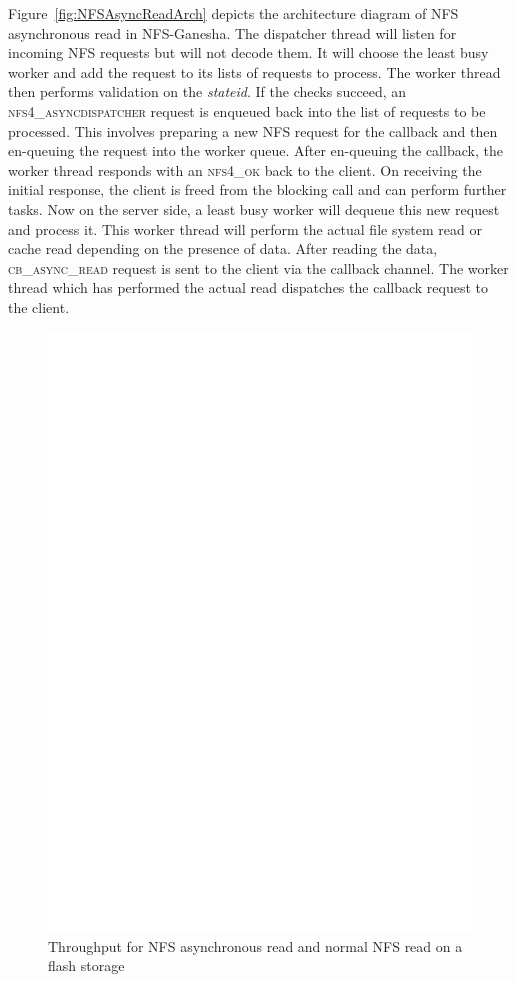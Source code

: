  Figure~\ref{fig:NFSAsyncReadArch} depicts the architecture diagram of NFS asynchronous read in NFS-Ganesha. The dispatcher thread will listen for incoming NFS requests but will not decode them. It will choose the least busy worker and add the request to its lists of requests to process. The worker thread then performs validation on the \textit{stateid}. If  the checks succeed, an \textsc{nfs4\_asyncdispatcher} request is enqueued back into the list of requests to be processed.  This involves preparing a new NFS request for the callback and then en-queuing the request into the worker queue. After en-queuing the callback, the worker thread responds with an \textsc{nfs4\_ok} back to the client. On receiving the initial response, the client is freed from the blocking call and can perform further tasks. Now on the server side, a least busy worker will dequeue this new request and process it. This worker thread will perform the actual file system read or cache read depending on the presence of data. After reading the data, \textsc{cb\_async\_read} request is sent to the client via the callback channel. The worker thread which has performed the actual read dispatches the callback request to the client. 
 
\begin{figure}
\centering
\includegraphics[scale=0.6]{figures/performancesequence.eps}
\caption{Throughput for NFS asynchronous read and normal NFS read on a flash storage}
\label{fig:performancesequence}
\end{figure}




 
 
 








